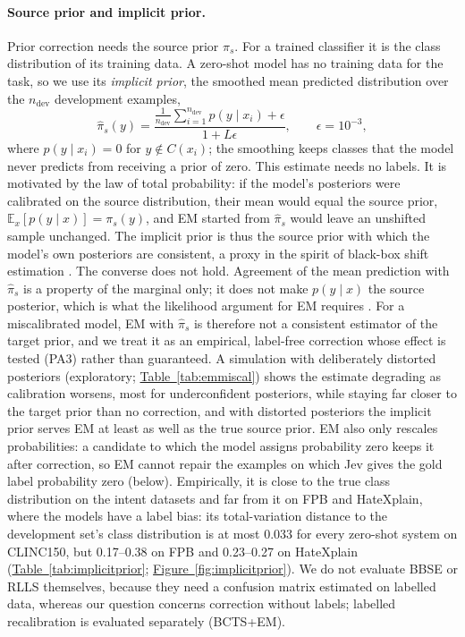 \paragraph{Source prior and implicit prior.}
Prior correction needs the source prior $\pi_s$. For a trained classifier it is the class distribution of its training
data. A zero-shot model has no training data for the task, so we use its \emph{implicit prior}, the smoothed mean
predicted distribution over the $n_{\mathrm{dev}}$ development examples,
\begin{equation}
  \hat\pi_s(y)=\frac{\frac{1}{n_{\mathrm{dev}}}\sum_{i=1}^{n_{\mathrm{dev}}}p(y\mid x_i)+\epsilon}{1+L\epsilon},
  \qquad \epsilon=10^{-3},
  \label{eq:implicit}
\end{equation}
where $p(y\mid x_i)=0$ for $y\notin C(x_i)$; the smoothing keeps classes that the model never predicts from receiving a
prior of zero. This estimate needs no labels. It is motivated by the law of total probability: if the model's posteriors
were calibrated on the source distribution, their mean would equal the source prior, $\mathbb{E}_{x}[p(y\mid
x)]=\pi_s(y)$, and EM started from $\hat\pi_s$ would leave an unshifted sample unchanged. The implicit prior is thus the
source prior with which the model's own posteriors are consistent, a proxy in the spirit of black-box shift estimation
\citep{lipton2018detecting}. The converse does not hold. Agreement of the mean prediction with $\hat\pi_s$ is a property
of the marginal only; it does not make $p(y\mid x)$ the source posterior, which is what the likelihood argument for EM
requires \citep{saerens2002adjusting}. For a miscalibrated model, EM with $\hat\pi_s$ is therefore not a consistent
estimator of the target prior, and we treat it as an empirical, label-free correction whose effect is tested (PA3)
rather than guaranteed. A simulation with deliberately distorted posteriors (exploratory;
\hyperref[tab:emmiscal]{Table~\ref*{tab:emmiscal}}) shows the estimate degrading as calibration worsens, most for
underconfident posteriors, while staying far closer to the target prior than no correction, and with distorted
posteriors the implicit prior serves EM at least as well as the true source prior. EM also only rescales probabilities: a candidate to which the model assigns
probability zero keeps it after correction, so EM cannot repair the examples on which Jev gives the gold label
probability zero (below). Empirically, it is close to the true class distribution on the intent datasets and far from it
on FPB and HateXplain, where the models have a label bias: its total-variation distance to the development set's class distribution is
at most 0.033 for every zero-shot system on CLINC150, but 0.17--0.38 on FPB and 0.23--0.27 on HateXplain
(\hyperref[tab:implicitprior]{Table~\ref*{tab:implicitprior}}; \hyperref[fig:implicitprior]{Figure~\ref*{fig:implicitprior}}). We do not evaluate BBSE or RLLS themselves, because they need a confusion
matrix estimated on labelled data, whereas our question concerns correction without labels; labelled recalibration is
evaluated separately (BCTS+EM).

